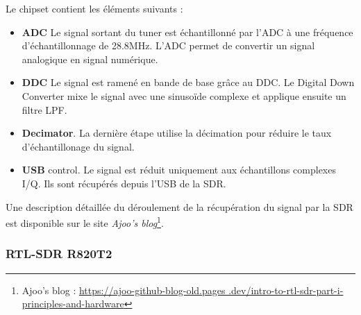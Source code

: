 \vspace{0.1cm}

Le chipset contient les éléments suivants :
\begin{itemize}
\item \textbf{\ac{ADC}} Le signal sortant du tuner est échantillonné par l'ADC à une fréquence d'échantillonnage de 28.8MHz. L'\ac{ADC} permet de convertir un signal analogique en signal numérique.
\item \textbf{\ac{DDC}} Le signal est ramené en bande de base grâce au DDC. Le Digital Down Converter mixe le signal avec une sinusoïde complexe et applique ensuite un filtre \ac{LPF}. 
\item \textbf{Decimator}. La dernière étape utilise la décimation pour réduire le taux d'échantillonage du signal.
\item \textbf{\ac{USB}} control. Le signal est réduit uniquement aux échantillons complexes \ac{I/Q}. Ils sont récupérés depuis l'\ac{USB} de la \ac{SDR}.
\end{itemize}

\vspace{0.1cm}

Une description détaillée du déroulement de la récupération du signal par la \ac{SDR} est disponible sur le site \textit{Ajoo's blog}\footnote{Ajoo's blog : \href{https://ajoo-github-blog-old.pages.dev/intro-to-rtl-sdr-part-i-principles-and-hardware}{https://ajoo-github-blog-old.pages
.dev/intro-to-rtl-sdr-part-i-principles-and-hardware}}.




\subsubsection{RTL-SDR R820T2}

